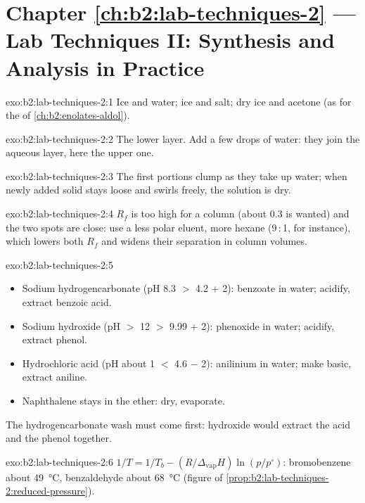 \section*{Chapter \ref{ch:b2:lab-techniques-2} --- Lab Techniques II: Synthesis and Analysis in Practice}

\begin{solution}{exo:b2:lab-techniques-2:1}
Ice and water; ice and salt; dry ice and acetone (as for the  of \cref{ch:b2:enolates-aldol}).
\end{solution}

\begin{solution}{exo:b2:lab-techniques-2:2}
The lower layer. Add a few drops of water: they join the aqueous layer, here the upper one.
\end{solution}

\begin{solution}{exo:b2:lab-techniques-2:3}
The first portions clump as they take up water; when newly added solid stays loose and swirls freely,
the solution is dry.
\end{solution}

\begin{solution}{exo:b2:lab-techniques-2:4}
$R_f$ is too high for a column (about 0.3 is wanted) and the two spots are close: use a less polar
eluent, more hexane (9\,:\,1, for instance), which lowers both $R_f$ and widens their separation in
column volumes.
\end{solution}

\begin{solution}{exo:b2:lab-techniques-2:5}
\begin{itemize}
  \item Sodium hydrogencarbonate (pH 8.3 $>$ 4.2 + 2): benzoate in water; acidify, extract benzoic acid.
  \item Sodium hydroxide (pH $>$ 12 $>$ 9.99 + 2): phenoxide in water; acidify, extract phenol.
  \item Hydrochloric acid (pH about 1 $<$ 4.6 $-$ 2): anilinium in water; make basic, extract aniline.
  \item Naphthalene stays in the ether: dry, evaporate.
\end{itemize}
The hydrogencarbonate wash must come first: hydroxide would extract the acid and the phenol together.
\end{solution}

\begin{solution}{exo:b2:lab-techniques-2:6}
$1/T = 1/T_b - (R/\Delta_{\mathrm{vap}}H)\ln(p/p^\circ)$: bromobenzene about \qty{49}{\degreeCelsius},
benzaldehyde about \qty{68}{\degreeCelsius} (figure of \cref{prop:b2:lab-techniques-2:reduced-pressure}).
\end{solution}


